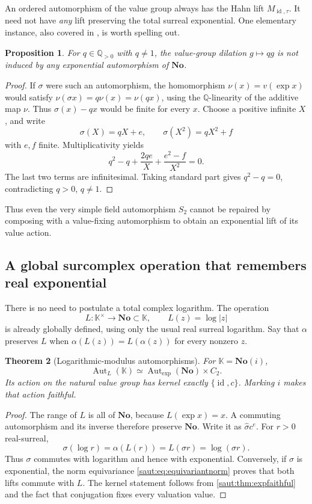 \documentclass[11pt]{article}
\newtheorem{theorem}{Theorem}[section]
\newtheorem{proposition}[theorem]{Proposition}
\theoremstyle{definition}
\theoremstyle{remark}
\newcommand{\No}{\mathbf{No}}
\newcommand{\Q}{\mathbb Q}
\newcommand{\K}{\mathbb K}
\newcommand{\id}{\operatorname{id}}
\newcommand{\Gexp}{\operatorname{Aut}_{\exp}(\No)}
\newcommand{\AutL}{\operatorname{Aut}_{L}}
\numberwithin{equation}{section}
\begin{document}
An ordered automorphism of the value group always has the Hahn lift
$M_{\id,\tau}$. It need not have \emph{any} lift preserving the total
surreal exponential. One elementary instance, also covered in
\cite{RepoRigidity}, is worth spelling out.

\begin{proposition}\label{saut:prop:rationalnonlift}
For $q\in\Q_{>0}$ with $q\ne1$, the value-group dilation $g\mapsto qg$
is not induced by any exponential automorphism of $\No$.
\end{proposition}
\begin{proof}
If $\sigma$ were such an automorphism, the homomorphism
$\nu(x)=v(\exp x)$ would satisfy
$\nu(\sigma x)=q\nu(x)=\nu(qx)$, using the $\Q$-linearity of the additive
map $\nu$. Thus
$\sigma(x)-qx$ would be finite for every $x$.
Choose a positive infinite $X$, and write
\[
 \sigma(X)=qX+e,\qquad \sigma(X^2)=qX^2+f
\]
with $e,f$ finite. Multiplicativity yields
\[
 q^2-q+\frac{2qe}{X}+\frac{e^2-f}{X^2}=0.
\]
The last two terms are infinitesimal. Taking standard part gives
$q^2-q=0$, contradicting $q>0$, $q\ne1$.
\end{proof}

Thus even the very simple field automorphism $S_2$ cannot be repaired by
composing with a value-fixing automorphism to obtain an exponential lift
of its value action.

\subsection{A global surcomplex operation that remembers real exponential}

There is no need to postulate a total complex logarithm. The operation
\begin{equation}\label{saut:eq:L}
 L:\K^\times\to\No\subset\K,
 \qquad L(z)=\log|z|
\end{equation}
is already globally defined, using only the usual real surreal logarithm.
Say that $\alpha$ preserves $L$ when
$\alpha(L(z))=L(\alpha(z))$ for every nonzero $z$.

\begin{theorem}[Logarithmic-modulus automorphisms]\label{saut:thm:L}
For $\K=\No(i)$,
\begin{equation}\label{saut:eq:LAUT}
 \AutL(\K)\simeq\Gexp\times C_2.
\end{equation}
Its action on the natural value group has kernel exactly $\{\id,c\}$.
Marking $i$ makes that action faithful.
\end{theorem}
\begin{proof}
The range of $L$ is all of $\No$, because $L(\exp x)=x$. A commuting
automorphism and its inverse therefore preserve $\No$. Write it as
$\widehat\sigma c^e$. For $r>0$ real-surreal,
\[
 \sigma(\log r)=\alpha(L(r))=L(\sigma r)=\log(\sigma r).
\]
Thus $\sigma$ commutes with logarithm and hence with exponential.
Conversely, if $\sigma$ is exponential, the norm equivariance
\eqref{saut:eq:equivariantnorm} proves that both lifts commute with $L$.
The kernel statement follows from \cref{saut:thm:expfaithful} and the fact that
conjugation fixes every valuation value.
\end{proof}
\end{document}
